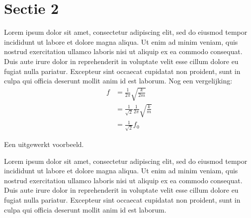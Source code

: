 \section{Sectie 2}
\label{sec:Sectie 2}
%
Lorem ipsum dolor sit amet, consectetur adipiscing elit, sed do eiusmod tempor incididunt ut labore et dolore magna aliqua. Ut enim ad minim veniam, quis nostrud exercitation ullamco laboris nisi ut aliquip ex ea commodo consequat. Duis aute irure dolor in reprehenderit in voluptate velit esse cillum dolore eu fugiat nulla pariatur. Excepteur sint occaecat cupidatat non proident, sunt in culpa qui officia deserunt mollit anim id est laborum.
%
%
Nog een vergelijking:
%
\begin{align}
f &= \frac{1}{2\pi} \sqrt{\frac{k}{2m}} \\
  & = \frac{1}{\sqrt{2}} \frac{1}{2\pi} \sqrt{\frac{k}{m}} \\
  & = \frac{1}{\sqrt{2}} f_{0}
\end{align}
%
%
\begin{voorbeeld}
Een uitgewerkt voorbeeld.
\par 
Lorem ipsum dolor sit amet, consectetur adipiscing elit, sed do eiusmod tempor incididunt ut labore et dolore magna aliqua. Ut enim ad minim veniam, quis nostrud exercitation ullamco laboris nisi ut aliquip ex ea commodo consequat. Duis aute irure dolor in reprehenderit in voluptate velit esse cillum dolore eu fugiat nulla pariatur. Excepteur sint occaecat cupidatat non proident, sunt in culpa qui officia deserunt mollit anim id est laborum.
\end{voorbeeld}
%